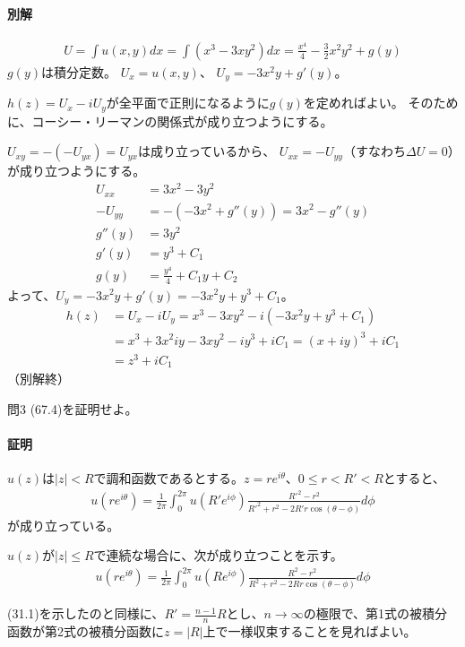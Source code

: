 \paragraph{別解}
\begin{align*}
    U=\int u(x,y)dx
    =\int (x^3-3xy^2)dx
    =\frac{x^4}{4}-\frac{3}{2}x^2y^2+g(y)
\end{align*}
$g(y)$は積分定数。
$U_x=u(x,y)$、
$U_y=-3x^2y+g'(y)$。

$h(z)=U_x-iU_y$が全平面で正則になるように$g(y)$を定めればよい。
そのために、コーシー・リーマンの関係式が成り立つようにする。

$U_{xy}=-(-U_{yx})=U_{yx}$は成り立っているから、
$U_{xx}=-U_{yy}$（すなわち$\Delta U=0$）が成り立つようにする。
\begin{align*}
    U_{xx}&=3x^2-3y^2\\
    -U_{yy}&=-(-3x^2+g''(y))=3x^2-g''(y)\\
    g''(y)&=3y^2\\
    g'(y)&=y^3+C_1\\
    g(y)&=\frac{y^4}{4}+C_1y+C_2
\end{align*}
よって、$U_y=-3x^2y+g'(y)=-3x^2y+y^3+C_1$。
\begin{align*}
    h(z)&=U_x-iU_y
    =x^3-3xy^2-i(-3x^2y+y^3+C_1)\\
    &=x^3+3x^2iy-3xy^2-iy^3+iC_1=(x+iy)^3+iC_1\\
    &=z^3+iC_1
\end{align*}
（別解終）

\newpage
\begin{mysimplebox}{問3}
    (67.4)を証明せよ。
\end{mysimplebox}
\paragraph{証明}
$u(z)$は$|z|<R$で調和函数であるとする。$z=re^{i\theta}$、$0\le r<R'<R$とすると、
\begin{align*}
    u(re^{i\theta})
    =\frac{1}{2\pi}\int_{0}^{2\pi}u(R'e^{i\phi})\frac{R'^2-r^2}{R'^2+r^2-2R'r\cos(\theta-\phi)}d\phi
\end{align*}
が成り立っている。

$u(z)$が$|z|\le R$で連続な場合に、次が成り立つことを示す。
\begin{align*}
    u(re^{i\theta})
    =\frac{1}{2\pi}\int_{0}^{2\pi}u(Re^{i\phi})\frac{R^2-r^2}{R^2+r^2-2Rr\cos(\theta-\phi)}d\phi
\end{align*}

(31.1)を示したのと同様に、$R'=\frac{n-1}{n}R$とし、$n\longrightarrow\infty$の極限で、第1式の被積分函数が第2式の被積分函数に$z=|R|$上で一様収束することを見ればよい。

